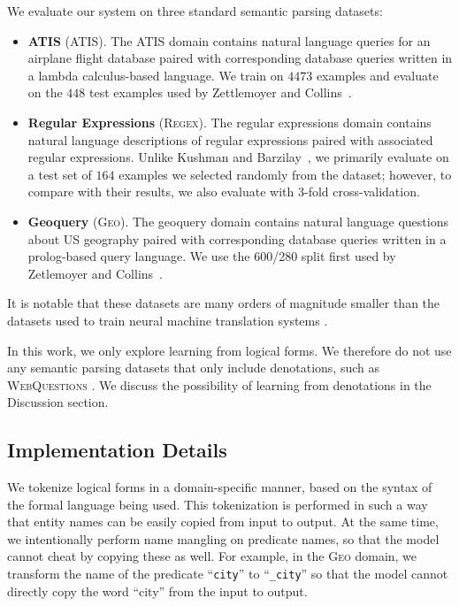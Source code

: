 \documentclass[11pt,letterpaper]{article}
\newcommand{\atis}{\textsc{ATIS}\xspace}
\newcommand{\regex}{\textsc{Regex}\xspace}
\newcommand{\geo}{\textsc{Geo}\xspace}
\newcommand\pl[1]{\textcolor{red}{[PL: #1]}}
\begin{document}
We evaluate our system on three standard semantic parsing datasets:
\begin{itemize}
  \item \textbf{ATIS} (\atis).  The ATIS domain contains 
    natural language queries for an airplane flight database
    paired with corresponding database queries written in a 
    lambda calculus-based language.  
    We train on $4473$ examples and evaluate on the $448$
    test examples used by Zettlemoyer and 
    Collins~.

  \item \textbf{Regular Expressions} (\regex).  The regular expressions domain
  contains natural language descriptions of regular expressions
  paired with associated regular expressions.
  Unlike Kushman and Barzilay~, 
  we primarily evaluate
  on a test set of $164$ examples we selected randomly
  from the dataset;
  however, to compare with their results, we also evaluate
  with 3-fold cross-validation.

  \item \textbf{Geoquery} (\geo).  The geoquery domain
  contains natural language questions about US geography
  paired with corresponding database queries written in a prolog-based
  query language.
  We use the 600/280 split first used by
  Zetlemoyer and Collins~.
\end{itemize}

It is notable that these datasets are many orders of magnitude smaller
than the datasets used to train neural machine translation systems
\cite{sutskever2014sequence,bahdanau2014neural}.

In this work, we only explore learning from logical forms.
We therefore do not use any semantic parsing datasets
that only include denotations,
such as \textsc{WebQuestions} \cite{berant2013freebase}.
We discuss the possibility of learning from denotations
in the Discussion section.


\subsection{Implementation Details}
We tokenize logical forms in a domain-specific manner,
based on the syntax of the formal language being used.
This tokenization is performed in such a way that
entity names can be easily copied from input to output.
At the same time, we intentionally perform name mangling on predicate names,
so that the model cannot cheat by copying these as well.
For example, in the \geo domain, we transform the name
of the predicate ``\texttt{city}'' to ``\texttt{\_city}''
so that the model cannot directly copy the word ``city'' from the input 
to output.
\end{document}
